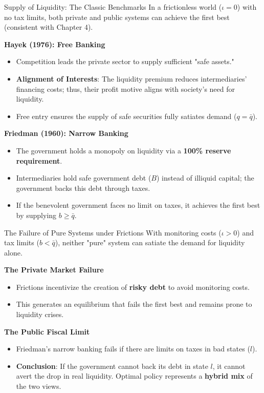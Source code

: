 \documentclass[11pt,aspectratio=169]{beamer}
\begin{document}
\begin{frame}{Supply of Liquidity: The Classic Benchmarks}
\small
In a frictionless world ($\iota=0$) with no tax limits, both private and public systems can achieve the first best (consistent with Chapter 4).

\vspace{0.3cm}
\textbf{Hayek (1976): Free Banking}
\begin{itemize}
    \item Competition leads the private sector to supply sufficient "safe assets."
    \item \textbf{Alignment of Interests}: The liquidity premium reduces intermediaries' financing costs; thus, their profit motive aligns with society's need for liquidity.
    \item Free entry ensures the supply of safe securities fully satiates demand ($q = \bar{q}$).
\end{itemize}

\vspace{0.3cm}
\textbf{Friedman (1960): Narrow Banking}
\begin{itemize}
    \item The government holds a monopoly on liquidity via a \textbf{100\% reserve requirement}.
    \item Intermediaries hold safe government debt ($B$) instead of illiquid capital; the government backs this debt through taxes.
    \item If the benevolent government faces no limit on taxes, it achieves the first best by supplying $b \geq \bar{q}$.
\end{itemize}
\end{frame}

\begin{frame}{The Failure of Pure Systems under Frictions}
\small
With monitoring costs ($\iota > 0$) and tax limits ($b < \bar{q}$), neither "pure" system can satiate the demand for liquidity alone.

\vspace{0.3cm}
\textbf{The Private Market Failure}
\begin{itemize}
    \item Frictions incentivize the creation of \textbf{risky debt} to avoid monitoring costs.
    \item This generates an equilibrium that fails the first best and remains prone to liquidity crises.
\end{itemize}

\vspace{0.3cm}
\textbf{The Public Fiscal Limit}
\begin{itemize}
    \item Friedman's narrow banking fails if there are limits on taxes in bad states ($l$).
    \item \textbf{Conclusion}: If the government cannot back its debt in state $l$, it cannot avert the drop in real liquidity. Optimal policy represents a \textbf{hybrid mix} of the two views.
\end{itemize}
\end{frame}
\end{document}
